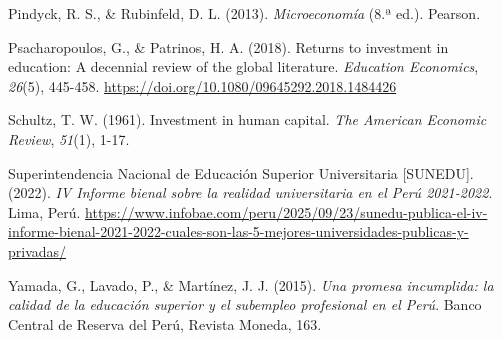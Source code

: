 \documentclass[11pt, a4paper]{article}
\begin{document}
\vspace{0.2cm}
\noindent\hangindent=1.27cm
Pindyck, R. S., \& Rubinfeld, D. L. (2013). \textit{Microeconomía} (8.ª ed.). Pearson.

\vspace{0.2cm}
\noindent\hangindent=1.27cm
Psacharopoulos, G., \& Patrinos, H. A. (2018). Returns to investment in education: A decennial review of the global literature. \textit{Education Economics}, \textit{26}(5), 445-458. \url{https://doi.org/10.1080/09645292.2018.1484426}

\vspace{0.2cm}
\noindent\hangindent=1.27cm
Schultz, T. W. (1961). Investment in human capital. \textit{The American Economic Review}, \textit{51}(1), 1-17.

\vspace{0.2cm}
\noindent\hangindent=1.27cm
Superintendencia Nacional de Educación Superior Universitaria [SUNEDU]. (2022). \textit{IV Informe bienal sobre la realidad universitaria en el Perú 2021-2022}. Lima, Perú. \url{https://www.infobae.com/peru/2025/09/23/sunedu-publica-el-iv-informe-bienal-2021-2022-cuales-son-las-5-mejores-universidades-publicas-y-privadas/}

\vspace{0.2cm}
\noindent\hangindent=1.27cm
Yamada, G., Lavado, P., \& Martínez, J. J. (2015). \textit{Una promesa incumplida: la calidad de la educación superior y el subempleo profesional en el Perú}. Banco Central de Reserva del Perú, Revista Moneda, 163.
\end{document}

